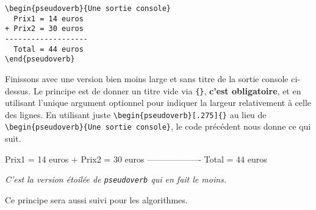 \documentclass[12pt,a4paper]{article}
\begin{document}
\begin{frame-gene}
	\small
	\begin{verbatim}
\begin{pseudoverb}{Une sortie console}
  Prix1 = 14 euros
+ Prix2 = 30 euros
-------------------
  Total = 44 euros
\end{pseudoverb} 
	\end{verbatim} 
\end{frame-gene}


Finissons avec une version bien moins large et sans titre de la sortie console ci-dessus. Le principe est de donner un titre vide via \verb+{}+, \textbf{c'est obligatoire}, et en utilisant l'unique argument optionnel pour indiquer la largeur relativement à celle des lignes.
En utilisant juste \verb+\begin{pseudoverb}[.275]{}+ au lieu de \verb+\begin{pseudoverb}{Une sortie console}+, le code précédent nous donne ce qui suit.


\begin{pseudoverb}[.275]{}
  Prix1 = 14 euros
+ Prix2 = 30 euros
-------------------
  Total = 44 euros
\end{pseudoverb} 


\bigskip


\begin{frame-gene}[À RETENIR]
	\centering\itshape
	C'est la version étoilée de \verb+pseudoverb+ qui en fait le moins.
	
	Ce principe sera aussi suivi pour les algorithmes. 
\end{frame-gene}
\end{document}
